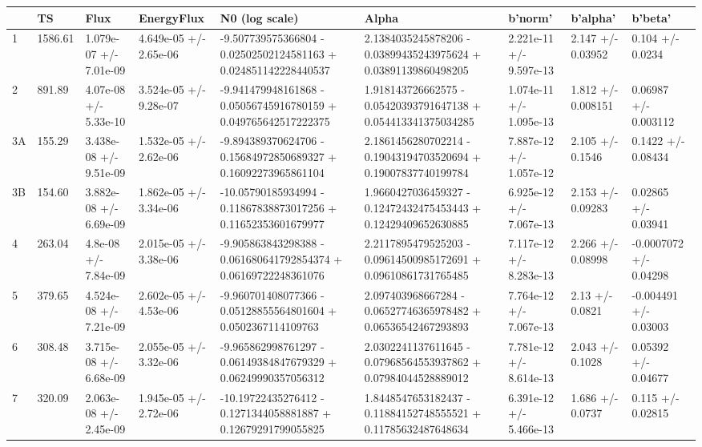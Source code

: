 \begin{tabular}{lllllllll}
\toprule
 & TS & Flux & EnergyFlux & N0 (log scale) & Alpha & b'norm' & b'alpha' & b'beta' \\
\midrule
1 &  1586.61 &  1.079e-07 +/- 7.01e-09 &  4.649e-05 +/- 2.65e-06 &  -9.507739575366804 - 0.02502502124581163 + 0.024851142228440537 &  2.1384035245878206 - 0.03899435243975624 + 0.03891139860498205 &   2.221e-11 +/-  9.597e-13 &       2.147 +/-    0.03952 &       0.104 +/-     0.0234 \\
2 &  891.89 &   4.07e-08 +/- 5.33e-10 &  3.524e-05 +/- 9.28e-07 &  -9.941479948161868 - 0.05056745916780159 + 0.049765642517222375 &  1.918143726662575 - 0.05420393791647138 + 0.054413341375034285 &   1.074e-11 +/-  1.095e-13 &       1.812 +/-   0.008151 &     0.06987 +/-   0.003112 \\
3A &  155.29 &  3.438e-08 +/- 9.51e-09 &  1.532e-05 +/- 2.62e-06 &  -9.894389370624706 - 0.15684972850689327 + 0.16092273965861104 &  2.1861456280702214 - 0.19043194703520694 + 0.19007837740199784 &   7.887e-12 +/-  1.057e-12 &       2.105 +/-     0.1546 &      0.1422 +/-    0.08434 \\
3B &  154.60 &  3.882e-08 +/- 6.69e-09 &  1.862e-05 +/- 3.34e-06 &  -10.05790185934994 - 0.11867838873017256 + 0.11652353601679977 &  1.9660427036459327 - 0.12472432475453443 + 0.12429409652630885 &   6.925e-12 +/-  7.067e-13 &       2.153 +/-    0.09283 &     0.02865 +/-    0.03941 \\
4 &  263.04 &    4.8e-08 +/- 7.84e-09 &  2.015e-05 +/- 3.38e-06 &  -9.905863843298388 - 0.061680641792854374 + 0.06169722248361076 &  2.2117895479525203 - 0.09614500985172691 + 0.09610861731765485 &   7.117e-12 +/-  8.283e-13 &       2.266 +/-    0.08998 &  -0.0007072 +/-    0.04298 \\
5 &  379.65 &  4.524e-08 +/- 7.21e-09 &  2.602e-05 +/- 4.53e-06 &  -9.960701408077366 - 0.05128855564801604 + 0.0502367114109763 &  2.097403968667284 - 0.06527746365978482 + 0.06536542467293893 &   7.764e-12 +/-  7.067e-13 &        2.13 +/-     0.0821 &   -0.004491 +/-    0.03003 \\
6 &  308.48 &  3.715e-08 +/- 6.68e-09 &  2.055e-05 +/- 3.32e-06 &  -9.965862998761297 - 0.06149384847679329 + 0.06249990357056312 &  2.0302241137611645 - 0.07968564553937862 + 0.07984044528889012 &   7.781e-12 +/-  8.614e-13 &       2.043 +/-     0.1028 &     0.05392 +/-    0.04677 \\
7 &  320.09 &  2.063e-08 +/- 2.45e-09 &  1.945e-05 +/- 2.72e-06 &  -10.19722435276412 - 0.1271344058881887 + 0.12679291799055825 &  1.8448547653182437 - 0.11884152748555521 + 0.11785632487648634 &   6.391e-12 +/-  5.466e-13 &       1.686 +/-     0.0737 &       0.115 +/-    0.02815 \\

\end{tabular}
